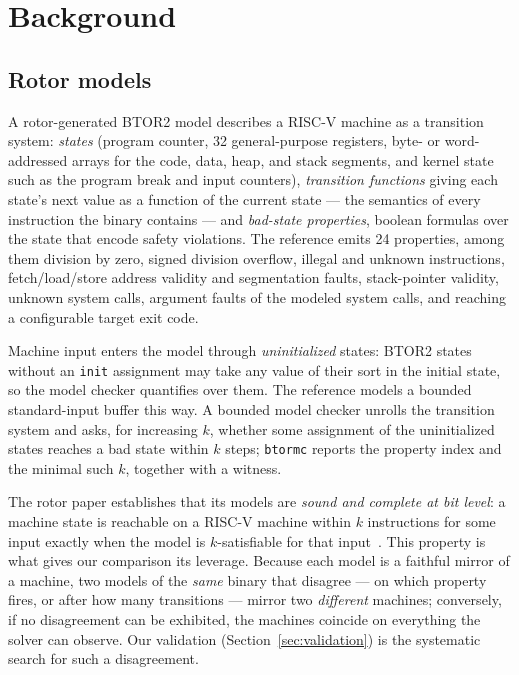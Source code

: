 \documentclass[sigplan,screen,nonacm]{acmart}
\begin{document}
\section{Background}
\label{sec:background}

\subsection{Rotor models}

A rotor-generated BTOR2 model describes a RISC-V machine as a transition
system: \emph{states} (program counter, 32 general-purpose registers,
byte- or word-addressed arrays for the code, data, heap, and stack
segments, and kernel state such as the program break and input
counters), \emph{transition functions} giving each state's next value as
a function of the current state --- the semantics of every instruction
the binary contains --- and \emph{bad-state properties}, boolean
formulas over the state that encode safety violations. The reference
emits 24 properties, among them division by zero, signed division
overflow, illegal and unknown instructions, fetch/load/store address
validity and segmentation faults, stack-pointer validity, unknown
system calls, argument faults of the modeled system calls, and reaching
a configurable target exit code.

Machine input enters the model through \emph{uninitialized} states:
BTOR2 states without an \texttt{init} assignment may take any value of
their sort in the initial state, so the model checker quantifies over
them. The reference models a bounded standard-input buffer this way. A
bounded model checker unrolls the transition system and asks, for
increasing $k$, whether some assignment of the uninitialized states
reaches a bad state within $k$ steps; \texttt{btormc} reports the
property index and the minimal such $k$, together with a witness.

The rotor paper establishes that its models are \emph{sound and
complete at bit level}: a machine state is reachable on a RISC-V
machine within $k$ instructions for some input exactly when the model
is $k$-satisfiable for that input~\cite{rotorpaper}. This property is
what gives our comparison its leverage. Because each model is a
faithful mirror of a machine, two models of the \emph{same} binary that
disagree --- on which property fires, or after how many transitions ---
mirror two \emph{different} machines; conversely, if no disagreement
can be exhibited, the machines coincide on everything the solver can
observe. Our validation (Section~\ref{sec:validation}) is the
systematic search for such a disagreement.
\end{document}
